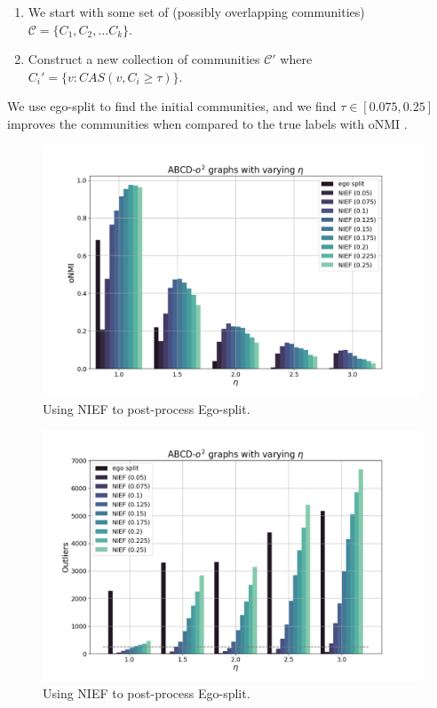 \documentclass{beamer}
\begin{document}
\begin{frame}{}
    \begin{enumerate}
        \color{darkblue}
        \item We start with some set of (possibly overlapping communities) $\mathcal{C} = \{C_1, C_2, \dots C_k\}$.
        \item Construct a new collection of communities $\mathcal{C}'$ where $C_i' = \{v: CAS(v, C_i \geq \tau)\}$.
    \end{enumerate}
    We use ego-split \citep{egosplit} to find the initial communities, and we find $\tau \in [0.075,0.25]$ improves the communities when compared to the true labels with oNMI \citep{onmi}.
\end{frame}
\begin{frame}{}
    \begin{figure}
        \includegraphics[height=0.7\textheight]{figures/ego_1.png}
        \caption{Using NIEF to post-process Ego-split.}
    \end{figure}
\end{frame}
\begin{frame}{}
    \begin{figure}
        \includegraphics[height=0.7\textheight]{figures/ego_2.png}
        \caption{Using NIEF to post-process Ego-split.}
    \end{figure}
\end{frame}
\end{document}
